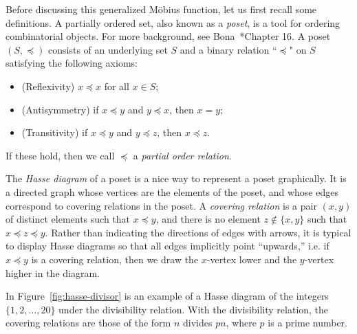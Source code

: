 \documentclass{amsart}
\theoremstyle{definition}
\newcommand{\Mobius}{M\"obius}
\begin{document}
Before discussing this generalized \Mobius{} function, let us first recall some definitions.
A partially ordered set, also known as a {\em poset}, is a tool for ordering combinatorial objects. 
For more background, see Bona~\cite{Bona}*{Chapter 16}. 
A poset $(S, \preccurlyeq)$ consists of an underlying set $S$ and a binary relation ``$\preccurlyeq$" on $S$ satisfying the following axioms: 
\begin{itemize}
    \item (Reflexivity)
    $x \preccurlyeq x$ for all $x \in S$;
    \item (Antisymmetry)
    if $x \preccurlyeq y$ and $y \preccurlyeq x$, then $x = y$;
    \item (Transitivity)
    if $x \preccurlyeq y$ and $y \preccurlyeq z$, then $x \preccurlyeq z$.
\end{itemize}
If these hold, then we call 
$\preccurlyeq$ a {\em partial order relation}.




The {\em Hasse diagram} of a poset is a nice way to represent a poset graphically. 
It is a directed graph whose vertices are the elements of the poset, and whose edges correspond to {covering relations} in the poset.
A {\em covering relation} is a pair $(x,y)$ of distinct elements such that $x \preccurlyeq y$, and there is no element $z \not\in \{x, y\}$ such that $x \preccurlyeq z \preccurlyeq y$.
Rather than indicating the directions of edges with arrows, it is typical to display Hasse diagrams so that all edges implicitly point ``upwards,'' i.e. if $x \preccurlyeq y$ is a covering relation, then we draw the $x$-vertex lower and the $y$-vertex higher in the diagram.

In Figure~\ref{fig:hasse-divisor} is an example of a Hasse diagram of the integers $\{1, 2, \ldots, 20\}$ under the divisibility relation.
With the divisibility relation, the covering relations are those of the form $n$ divides $pn$, where $p$ is a prime number.
\end{document}

